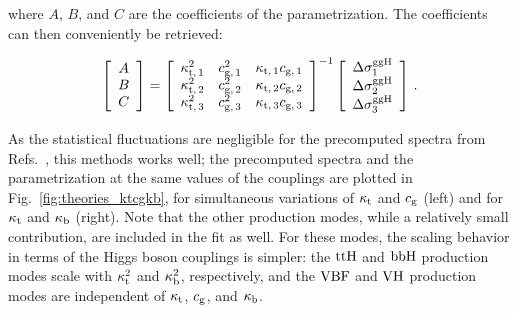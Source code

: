 % 
where $A$, $B$, and $C$ are the coefficients of the parametrization.
% 
The coefficients can then conveniently be retrieved:
% 
\begin{linenomath*}
\begin{equation}
\left[\begin{array}{c}
A \\
B \\
C
\end{array}\right]
=
    \left[\begin{array}{ccc}
        \kappa_{\mathrm{t},\,1}^2  &  c_{\mathrm{g},\,1}^2   &  \kappa_{\mathrm{t},\,1} c_{\mathrm{g},\,1} \\
        \kappa_{\mathrm{t},\,2}^2  &  c_{\mathrm{g},\,2}^2   &  \kappa_{\mathrm{t},\,2} c_{\mathrm{g},\,2} \\
        \kappa_{\mathrm{t},\,3}^2  &  c_{\mathrm{g},\,3}^2   &  \kappa_{\mathrm{t},\,3} c_{\mathrm{g},\,3}
        \end{array}\right]^{-1}
    \left[\begin{array}{c}
        \Delta\sigma_1^{\mathrm{g}\mathrm{g}\mathrm{H}} \\
        \Delta\sigma_2^{\mathrm{g}\mathrm{g}\mathrm{H}} \\
        \Delta\sigma_3^{\mathrm{g}\mathrm{g}\mathrm{H}}
        \end{array}\right]
    \,.
\end{equation}
\end{linenomath*}
% 
As the statistical fluctuations are negligible for the precomputed spectra from Refs.~\cite{Grazzini:2017szg,Grazzini:2016paz}, this methods works well; the precomputed spectra and the parametrization at the same values of the couplings are plotted in Fig.~\ref{fig:theories_ktcgkb}, for simultaneous variations of $\kappa_{\mathrm{t}}$ and $c_\mathrm{g}$ (left) and for $\kappa_{\mathrm{t}}$ and $\kappa_{\mathrm{b}}$ (right).
% 
Note that the other production modes, while a relatively small contribution, are included in the fit as well.
% 
For these modes, the scaling behavior in terms of the Higgs boson couplings is simpler: the $\mathrm{t}\mathrm{t}\mathrm{H}$ and $\mathrm{b}\mathrm{b}\mathrm{H}$ production modes scale with $\kappa_{\mathrm{t}}^2$ and $\kappa_{\mathrm{b}}^2$, respectively, and the $\text{VBF}$ and $\mathrm{V}\mathrm{H}$ production modes are independent of $\kappa_{\mathrm{t}}$, $c_\mathrm{g}$, and $\kappa_{\mathrm{b}}$.


